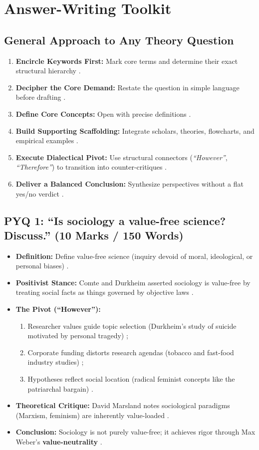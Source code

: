 \sectiondivider

\section{Answer-Writing Toolkit}

\subsection{General Approach to Any Theory Question}
\begin{enumerate}
    \item \textbf{Encircle Keywords First:} Mark core terms and determine their exact structural hierarchy .
    \item \textbf{Decipher the Core Demand:} Restate the question in simple language before drafting .
    \item \textbf{Define Core Concepts:} Open with precise definitions .
    \item \textbf{Build Supporting Scaffolding:} Integrate scholars, theories, flowcharts, and empirical examples .
    \item \textbf{Execute Dialectical Pivot:} Use structural connectors (\textit{``However''}, \textit{``Therefore''}) to transition into counter-critiques .
    \item \textbf{Deliver a Balanced Conclusion:} Synthesize perspectives without a flat yes/no verdict .
\end{enumerate}

\subsection{PYQ 1: ``Is sociology a value-free science? Discuss.'' (10 Marks / 150 Words)}
\begin{itemize}
    \item \textbf{Definition:} Define value-free science (inquiry devoid of moral, ideological, or personal biases) .
    \item \textbf{Positivist Stance:} Comte and Durkheim asserted sociology is value-free by treating social facts as things governed by objective laws .
    \item \textbf{The Pivot (``However''):}
    \begin{enumerate}
        \item Researcher values guide topic selection (Durkheim's study of suicide motivated by personal tragedy) ;
        \item Corporate funding distorts research agendas (tobacco and fast-food industry studies) ;
        \item Hypotheses reflect social location (radical feminist concepts like the patriarchal bargain) .
    \end{enumerate}
    \item \textbf{Theoretical Critique:} David Marsland notes sociological paradigms (Marxism, feminism) are inherently value-loaded .
    \item \textbf{Conclusion:} Sociology is not purely value-free; it achieves rigor through Max Weber's \textbf{value-neutrality} .
\end{itemize}

